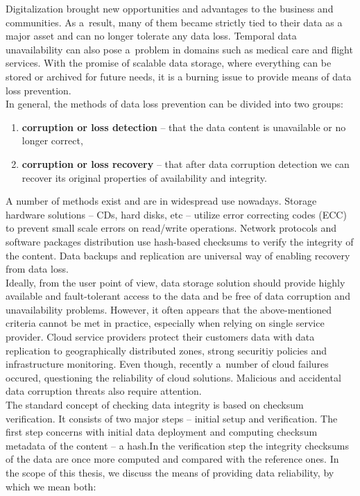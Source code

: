 Digitalization brought new opportunities and advantages to the business and communities.
As a~result, many of them became strictly tied to their data as a major asset and
can no longer tolerate any data loss. Temporal data unavailability can also pose 
a~problem in domains such as medical care and flight services. With the promise
of scalable data storage, where everything can be stored or archived for future
needs, it is a burning issue to provide means of data loss prevention.\\

In general, the methods of data loss prevention can be divided into two groups:

\begin{enumerate}
\item \textbf{corruption or loss detection} -- that the data content is unavailable
or no longer correct,
\item \textbf{corruption or loss recovery} -- that after data corruption detection
we can recover its original properties of availability and integrity.
\end{enumerate}

A number of methods exist and are in widespread use nowadays. Storage hardware
solutions -- CDs, hard disks, etc -- utilize error correcting codes (ECC) to prevent
small scale errors on read/write operations. Network protocols and software packages
distribution use hash-based checksums to verify the integrity of the content. Data
backups and replication are universal way of enabling recovery from data loss.\\

Ideally, from the user point of view, data storage solution should provide highly
available and fault-tolerant access to the data and be free of data corruption and
unavailability problems. However, it often appears that the above-mentioned
criteria cannot be met in practice,
especially when relying on single service provider. Cloud service providers protect
their customers data with data replication to geographically distributed zones,
strong securitiy policies and infrastructure monitoring. Even though, recently
a~number of cloud failures occured, questioning the reliability of
cloud solutions. Malicious and accidental data corruption threats also require
attention.\\ 

The standard concept of checking data integrity is based on checksum verification.
It consists of two major steps -- initial setup and verification. The first step
concerns with initial data deployment and computing checksum metadata of the content
-- a hash.In the verification step the integrity checksums of the data are once more
computed and compared with the reference ones. In the scope of this thesis, we discuss
the means of providing data reliability, by which we mean both:

